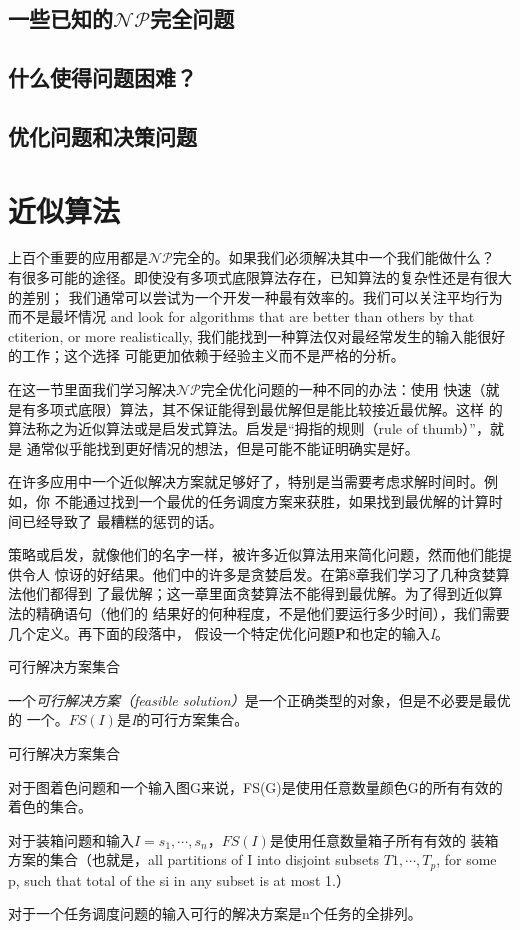 \subsection{一些已知的$\mathcal {NP}$完全问题}
\subsection{什么使得问题困难？}
\subsection{优化问题和决策问题}

\section{近似算法}
上百个重要的应用都是$\mathcal{NP}$完全的。如果我们必须解决其中一个我们能做什么？
有很多可能的途径。即使没有多项式底限算法存在，已知算法的复杂性还是有很大的差别；
我们通常可以尝试为一个开发一种最有效率的。我们可以关注平均行为而不是最坏情况
and look for algorithms that are better than others by that ctiterion, or more
realistically, 我们能找到一种算法仅对最经常发生的输入能很好的工作；这个选择
可能更加依赖于经验主义而不是严格的分析。

在这一节里面我们学习解决$\mathcal{NP}$完全优化问题的一种不同的办法：使用
快速（就是有多项式底限）算法，其不保证能得到最优解但是能比较接近最优解。这样
的算法称之为近似算法或是启发式算法。启发是“拇指的规则（rule of thumb）”，就是
通常似乎能找到更好情况的想法，但是可能不能证明确实是好。

在许多应用中一个近似解决方案就足够好了，特别是当需要考虑求解时间时。例如，你
不能通过找到一个最优的任务调度方案来获胜，如果找到最优解的计算时间已经导致了
最糟糕的惩罚的话。

策略或启发，就像他们的名字一样，被许多近似算法用来简化问题，然而他们能提供令人
惊讶的好结果。他们中的许多是贪婪启发。在第8章我们学习了几种贪婪算法他们都得到
了最优解；这一章里面贪婪算法不能得到最优解。为了得到近似算法的精确语句（他们的
结果好的何种程度，不是他们要运行多少时间），我们需要几个定义。再下面的段落中，
假设一个特定优化问题\textbf{P}和也定的输入\emph{I}。

\begin{definition}
可行解决方案集合

一个\emph{可行解决方案（feasible solution）}是一个正确类型的对象，但是不必要是最优的
一个。$FS(I)$是\emph{I}的可行方案集合。
\end{definition}

\begin{example}
可行解决方案集合

对于图着色问题和一个输入图G来说，FS(G)是使用任意数量颜色G的所有有效的
着色的集合。

对于装箱问题和输入$I={s_1,\cdots,s_n}$，$FS(I)$是使用任意数量箱子所有有效的
装箱方案的集合（也就是，all partitions of I into disjoint subsets
 $T1, \cdots,T_p$, for some p, such that total of the si in any subset
 is at most 1.）

对于一个任务调度问题的输入可行的解决方案是n个任务的全排列。
\end{example}

